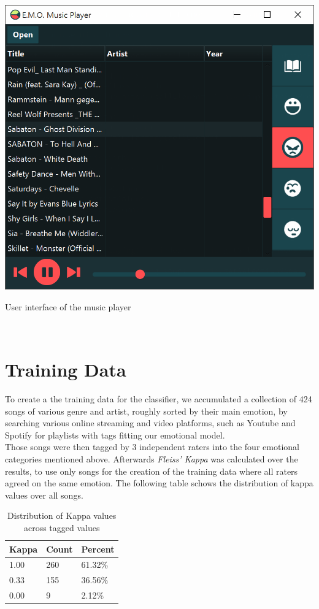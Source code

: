 \documentclass{sigchi-ext}
\begin{document}
\begin{marginfigure}[0pc]
  \begin{minipage}{\marginparwidth}
    \centering
    \includegraphics[width=1.0\marginparwidth]{images/screenshot.png}
  	\caption{User interface of the music player}~\label{fig:screenshot}
  \end{minipage}
\end{marginfigure}

\section{Training Data}\label{training-data}
To create a the training data for the classifier, we accumulated a collection of 424 songs of various genre and artist, roughly sorted by their main emotion, by searching various online streaming and video platforms, such as Youtube and Spotify for playlists with tags fitting our emotional model.\\
Those songs were then tagged by 3 independent raters into the four emotional categories mentioned above. Afterwards \textit{Fleiss' Kappa} was calculated over the results, to use only songs for the creation of the training data where all raters agreed on the same emotion. The following table schows the distribution of kappa values over all songs.\\

\begin{table}
  \centering
  \label{kappa-distribution}
  \begin{tabular}{@{}lll@{}}
    Kappa & Count & Percent \\ \midrule
    1.00 & 260 & 61.32\% \\
    0.33 & 155 & 36.56\% \\
    0.00 & 9 	 & 2.12\%
  \end{tabular}
  \caption{Distribution of Kappa values across tagged values}
\end{table}
\end{document}
